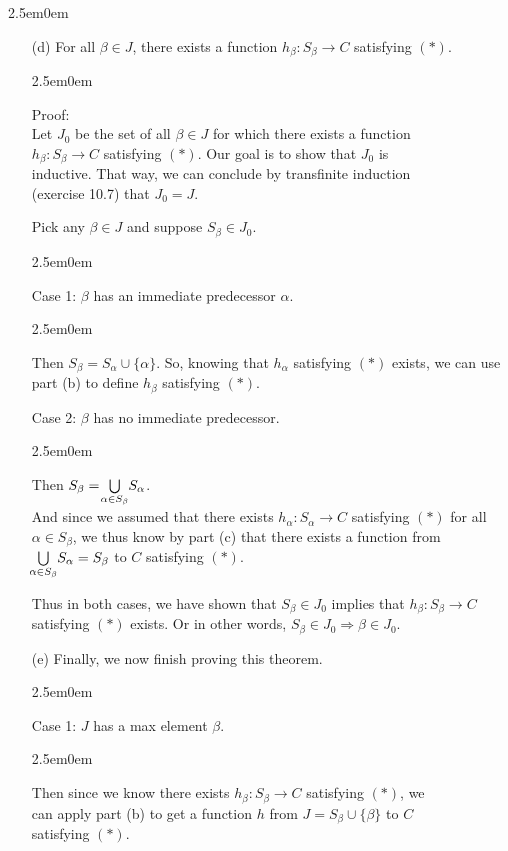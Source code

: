 \documentclass{book}
\newcommand{\exPP}{%
   \color{RedViolet}%
   \fontsize{12}{14}\selectfont%
}
\newenvironment{myIndent}{%
   \begin{adjustwidth}{2.5em}{0em}%
}{%
   \end{adjustwidth}%
}
\newcommand{\retTwo}{\hfill\bigbreak}
\begin{document}
\begin{myIndent}
\begin{itemize}
         \item[(d)] For all $\beta \in J$, there exists a function $h_\beta: S_\beta \longrightarrow C$ satisfying $(*)$.
         \begin{myIndent}\exPP
            Proof:\\
            Let $J_0$ be the set of all $\beta \in J$ for which there exists a function\\ $h_\beta: S_\beta \longrightarrow C$ satisfying $(*)$. Our goal is to show that $J_0$ is\\ inductive. That way, we can conclude by transfinite induction\\ (exercise 10.7) that $J_0 = J$.\retTwo

            Pick any $\beta\in J$ and suppose $S_\beta \in J_0$.
            \begin{myIndent}
               Case 1: $\beta$ has an immediate predecessor $\alpha$.
               \begin{myIndent}
                  Then $S_\beta = S_\alpha \cup \{\alpha\}$. So, knowing that $h_\alpha$ satisfying $(*)$ exists, we can use part (b) to define $h_\beta$ satisfying $(*)$.\retTwo
               \end{myIndent}

               Case 2: $\beta$ has no immediate predecessor.
               \begin{myIndent}
                  Then $S_\beta = \hspace{-0.2em}\bigcup\limits_{\alpha \in S_\beta}\hspace{-0.2em}S_\alpha$.\\ [0pt] And since we assumed that there exists $h_\alpha: S_\alpha \longrightarrow C$ satisfying $(*)$ for all $\alpha \in S_\beta$, we thus know by part (c) that there exists a function from $\hspace{-0.2em}\bigcup\limits_{\alpha \in S_\beta}\hspace{-0.2em}S_\alpha = S_\beta$ to $C$ satisfying $(*)$.\\
               \end{myIndent}
            \end{myIndent}

            Thus in both cases, we have shown that $S_\beta \in J_0$ implies that $h_\beta: S_\beta \longrightarrow C$ satisfying $(*)$ exists. Or in other words, $S_\beta \in J_0 \Longrightarrow \beta \in J_0$.\retTwo
         \end{myIndent}

         \item[(e)] Finally, we now finish proving this theorem.
         \begin{myIndent}\exPP
            Case 1: $J$ has a max element $\beta$.
            \begin{myIndent}
               Then since we know there exists $h_\beta: S_\beta \longrightarrow C$ satisfying $(*)$, we\\ can apply part (b) to get a function $h$ from $J = S_\beta \cup \{\beta\}$ to $C$\\ satisfying $(*)$.\newpage
            \end{myIndent}


\end{myIndent}
\end{itemize}
\end{myIndent}
\end{document}
